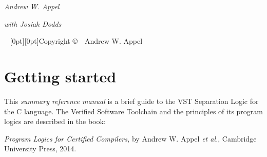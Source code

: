 \documentclass[12pt,fleqn,openany,oneside,showtrims]{memoir}
\begin{document}
\frontmatter
{}
\thispagestyle{empty}%
{
\centering
  \vspace*{4pc}%
  \fontsize{48}{48}\selectfont\par{}%

\vskip50pt
  \fontsize{20}{30}\selectfont\par{}%

\vskip50pt
  \fontsize{14}{16}\selectfont\par{}
\vskip100pt
\par
\vskip10pt
{\fontsize{24}{30}\selectfont\par\noindent%
{\itshape Andrew W. Appel}}\par
\vskip10pt
{\fontsize{16}{19}\selectfont\par\noindent%
{\centering \itshape with Josiah Dodds\\}}
}

~\vfill
\setlength{\parindent}{0pt}
\setlength{\parskip}{\baselineskip}
\clearpage
\raisebox{-7in}[0pt][0pt]{Copyright \copyright\ \the\year\ Andrew W. Appel}

\tableofcontents  %

\clearpage
\savepagenumber
\mainmatter
\restorepagenumber
\renewcommand{\chaptermark}[1]{\markboth{\thechapter.~#1\hfill{\textcolor{red}\thefile}\hspace*{2em}}{}}

\chapter{Getting started}

This \emph{summary reference manual} 
is a brief guide to the
VST Separation Logic for the C language.
The Verified Software Toolchain and
the principles of its program logics
are described in the book:

\noindent \emph{\large Program Logics for Certified Compilers,}\newline
by Andrew W. Appel \emph{et al.},
Cambridge University Press, 2014.  
\vspace{-2ex}
\end{document}
